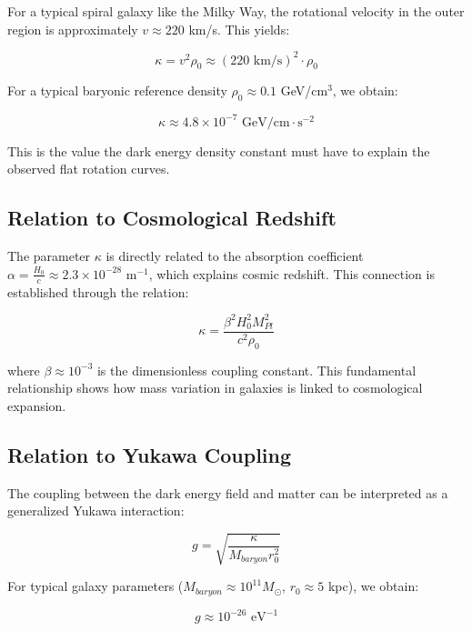 \documentclass[a4paper,12pt]{article}
\begin{document}
For a typical spiral galaxy like the Milky Way, the rotational velocity in the outer region is approximately $v \approx 220$ km/s. This yields:

\begin{equation}
	\kappa = v^2 \rho_0 \approx (220 \text{ km/s})^2 \cdot \rho_0
\end{equation}

For a typical baryonic reference density $\rho_0 \approx 0.1$ GeV/cm$^3$, we obtain:

\begin{equation}
	\kappa \approx 4.8 \times 10^{-7} \text{ GeV/cm} \cdot \text{s}^{-2}
\end{equation}

This is the value the dark energy density constant must have to explain the observed flat rotation curves.

\subsection{Relation to Cosmological Redshift}

The parameter $\kappa$ is directly related to the absorption coefficient $\alpha = \frac{H_0}{c} \approx 2.3 \times 10^{-28}$ m$^{-1}$, which explains cosmic redshift. This connection is established through the relation:

\begin{equation}
	\kappa = \frac{\beta^2 H_0^2 M_{Pl}^2}{c^2 \rho_0}
\end{equation}

where $\beta \approx 10^{-3}$ is the dimensionless coupling constant. This fundamental relationship shows how mass variation in galaxies is linked to cosmological expansion.

\subsection{Relation to Yukawa Coupling}

The coupling between the dark energy field and matter can be interpreted as a generalized Yukawa interaction:

\begin{equation}
	g = \sqrt{\frac{\kappa}{M_{baryon} r_0^2}}
\end{equation}

For typical galaxy parameters ($M_{baryon} \approx 10^{11} M_{\odot}$, $r_0 \approx 5$ kpc), we obtain:

\begin{equation}
	g \approx 10^{-26} \text{ eV}^{-1}
\end{equation}
\end{document}
